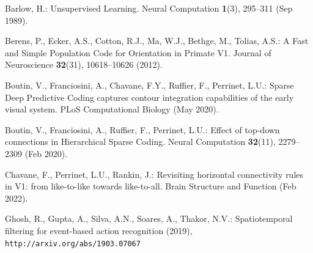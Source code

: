 \documentclass[runningheads]{llncs}
\begin{document}
\begin{thebibliography}{10}
  \providecommand{\url}[1]{\texttt{#1}}
  \providecommand{\urlprefix}{URL }
  \providecommand{\doi}[1]{https://doi.org/#1}
  
  Barlow, H.: Unsupervised {Learning}. Neural Computation  \textbf{1}(3),  295--311 (Sep 1989). %
  
  Berens, P., Ecker, A.S., Cotton, R.J., Ma, W.J., Bethge, M., Tolias, A.S.: A {Fast} and {Simple} {Population} {Code} for {Orientation} in {Primate} {V1}. Journal of Neuroscience  \textbf{32}(31),  10618--10626 (2012). %
  
  Boutin, V., Franciosini, A., Chavane, F.Y., Ruffier, F., Perrinet, L.U.: Sparse {Deep} {Predictive} {Coding} captures contour integration capabilities of the early visual system. PLoS Computational Biology  (May 2020). %
  
  Boutin, V., Franciosini, A., Ruffier, F., Perrinet, L.U.: Effect of top-down connections in {Hierarchical} {Sparse} {Coding}. Neural Computation  \textbf{32}(11),  2279--2309 (Feb 2020). %
  
  Chavane, F., Perrinet, L.U., Rankin, J.: Revisiting horizontal connectivity rules in {V1}: from like-to-like towards like-to-all. Brain Structure and Function  (Feb 2022). %
  
  Ghosh, R., Gupta, A., Silva, A.N., Soares, A., Thakor, N.V.: Spatiotemporal filtering for event-based action recognition (2019), \url{http://arxiv.org/abs/1903.07067}
  

\end{thebibliography}
\end{document}
